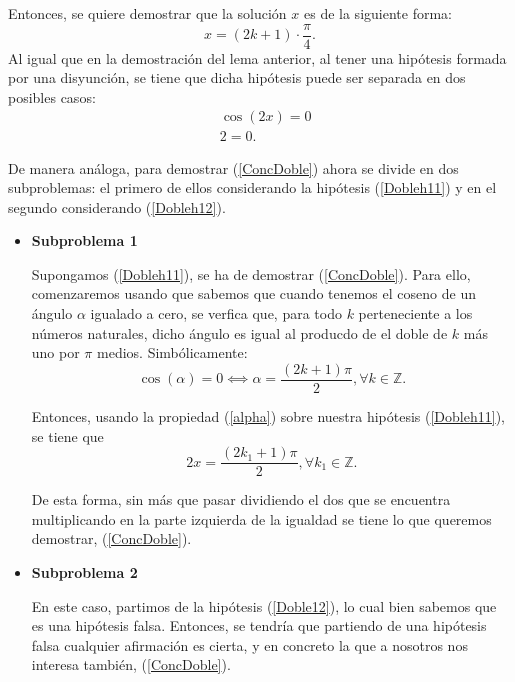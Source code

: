 \begin{demostracion}
  Entonces, se quiere demostrar que la solución \(x\) es de la
  siguiente forma:
  \begin{equation}\label{ConcDoble}
    x=(2k+1)⋅\frac{π}{4}.
  \end{equation}
  Al igual que en la demostración del lema anterior, al tener una
  hipótesis formada por una disyunción, se tiene que dicha hipótesis
  puede ser separada en dos posibles casos:
  \begin{align}
    &\cos(2x)=0 \label{Dobleh11}\tag{h11}\\
    &2=0. \label{Dobleh12}\tag{h12}
  \end{align}

  De manera análoga, para demostrar (\ref{ConcDoble}) ahora se
  divide en dos subproblemas: el primero de ellos considerando
  la hipótesis (\ref{Dobleh11}) y en el segundo considerando
  (\ref{Dobleh12}).

  \begin{itemize}
  \item \textbf{Subproblema 1}

    Supongamos (\ref{Dobleh11}), se ha de demostrar
    (\ref{ConcDoble}). Para ello, comenzaremos usando que sabemos
    que cuando tenemos el coseno de un ángulo \( α \) igualado
    a cero, se verfica que, para todo \(k\) perteneciente a los
    números naturales, dicho ángulo es igual al producdo de el
    doble de \(k\) más uno por \(π \) medios. Simbólicamente:
    \begin{equation}\label{alpha}
      \cos(α)=0 ⟺ α=\frac{(2k+1)π}{2}, ∀ k ∈ ℤ.
    \end{equation}

    Entonces, usando la propiedad (\ref{alpha}) sobre nuestra
    hipótesis (\ref{Dobleh11}), se tiene que
    \begin{equation}\label{hk1}\tag{hk1}
      2x=\frac{(2k_1+1)π}{2}, ∀ k_1 ∈ ℤ.
    \end{equation}

    De esta forma, sin más que pasar dividiendo el dos que se
    encuentra multiplicando en la parte izquierda de la igualdad
    se tiene lo que queremos demostrar, (\ref{ConcDoble}).

  \item \textbf{Subproblema 2}

    En este caso, partimos de la hipótesis (\ref{Doble12}), lo cual
    bien sabemos que es una hipótesis falsa. Entonces, se tendría
    que partiendo de una hipótesis falsa cualquier afirmación es
    cierta, y en concreto la que a nosotros nos interesa también,
    (\ref{ConcDoble}).
  \end{itemize}


\end{demostracion}
